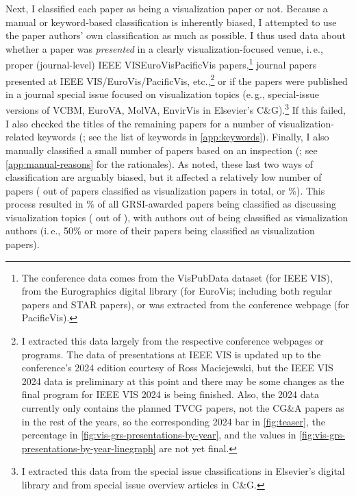 \documentclass[conference]{vgtc}                     %
\newcommand{\eg}{e.\,g.}
\newcommand{\ie}{i.\,e.}
\begin{document}
Next, I classified each paper as being a visualization paper or not. Because a manual or keyword-based classification is inherently biased, I attempted to use the paper authors' own classification as much as possible. I thus used data about whether a paper was \emph{presented} in a clearly visualization-focused venue, \ie, proper (journal-level) IEEE VIS\discretionary{/}{}{/}Euro\-Vis\discretionary{/}{}{/}Paci\-fic\-Vis papers,\footnote{The conference data comes from the VisPubData dataset \cite{Isenberg:2017:VMC} (for IEEE VIS), from the Eurographics digital library (for EuroVis; including both regular papers and STAR papers), or was extracted from the conference webpage (for PacificVis).} journal papers presented at IEEE VIS/EuroVis/PacificVis, etc.,\footnote{\label{foot:vis_presentations}I extracted this data largely from the respective conference webpages or programs. The data of presentations at IEEE VIS is updated up to the conference's 2024 edition courtesy of Ross Maciejewski, but the IEEE VIS 2024 data is preliminary at this point and there may be some changes as the final program for IEEE VIS 2024 is being finished. Also, the 2024 data currently only contains the planned TVCG papers, not the CG\&A papers as in the rest of the years, so the corresponding 2024 bar in \autoref{fig:teaser}, the percentage in \autoref{fig:vis-grs-presentations-by-year}, and the values in \autoref{fig:vis-grs-presentations-by-year-linegraph} are not yet final.} or if the papers were published in a journal special issue focused on visualization topics (\eg, special-issue versions of VCBM, EuroVA, MolVA, EnvirVis in Elsevier's C\&G).\footnote{I extracted this data from the special issue classifications in Elsevier's digital library and from special issue overview articles in C\&G.} If this failed, I also checked the titles of the remaining papers for a number of visualization-related keywords (\GrsiVisByKeywordPapersCount{}\texttimes; see the list of keywords in \autoref{app:keywords}). Finally, I also manually classified a small number of papers based on an inspection (\GrsiVisManuallyMarkedPapersCount{}\texttimes; see \autoref{app:manual-reasons} for the rationales). As noted, these last two ways of classification are arguably biased, but it affected a relatively low number of papers (\GrsiVisKeywordPlusManualPapersCount{} out of \GrsiTotalVisPapers{} papers classified as visualization papers in total, or \GrsiVisKeywordPlusManualPapersPercentage{}\%). This process resulted in \GrsiPercentageVisPapers{}\% of all GRSI-awarded papers being classified as discussing visualization topics (\GrsiTotalVisPapers{} out of \GrsiTotalPapers{}), with \GrsiTotalVisAuthors{} authors out of \GrsiTotalAuthors{} being classified as visualization authors (\ie, 50\% or more of their papers being classified as visualization papers).
\end{document}
